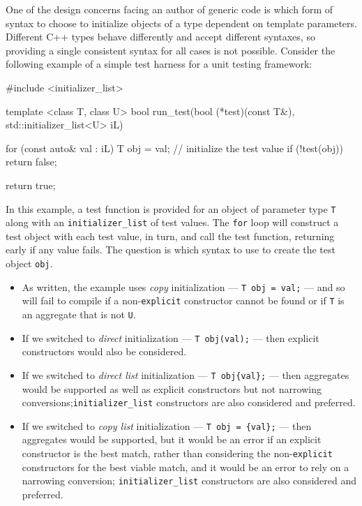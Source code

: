 One of the design concerns facing an author of generic code is which
form of syntax to choose to initialize objects of a type dependent on
template parameters. Different C++ types behave differently and accept
different syntaxes, so providing a single consistent syntax for all
cases is not possible. Consider the following example of a simple test
harness for a unit testing framework:

\begin{emcppslisting}
#include <initializer_list>

template <class T, class U>
bool run_test(bool (*test)(const T&), std::initializer_list<U> iL)
{
    for (const auto& val : iL)
    {
        T obj = val;      // initialize the test value
        if (!test(obj))
        {
            return false;
        }
    }

    return true;
}
\end{emcppslisting}


\noindent In this example, a test function is provided for an object of parameter
type \lstinline!T! along with an \lstinline!initializer_list! of test values.
The \lstinline!for! loop will construct a test object with each test value,
in turn, and call the test function, returning early if any value fails.
The question is which syntax to use to create the test object
\lstinline!obj!.

\begin{itemize}
\item{As written, the example uses \emph{copy} initialization --- \lstinline!T!~\lstinline!obj!~\lstinline!=!~\lstinline!val;! --- and so will fail to compile if a non-\lstinline!explicit! constructor cannot be found or if \lstinline!T! is an aggregate that is not \lstinline!U!.}
\item{If we switched to \emph{direct} initialization --- \lstinline!T!~\lstinline!obj(val);! --- then explicit constructors would also be considered.}
\item{If we switched to \emph{direct list} initialization --- \lstinline!T!~\lstinline!obj{val};! --- then aggregates would be supported as well as explicit constructors but not narrowing conversions;\linebreak[4] \lstinline!initializer_list! constructors are also considered and preferred.}
\item{If we switched to \emph{copy list} initialization --- \lstinline!T!~\lstinline!obj!~\lstinline!=!~\lstinline!{val};! --- then aggregates would be supported, but it would be an error if an explicit constructor is the best match, rather than considering the non-\lstinline!explicit! constructors for the best viable match, and it would be an error to rely on a narrowing conversion; \lstinline!initializer_list! constructors are also considered and preferred.}
\end{itemize}

